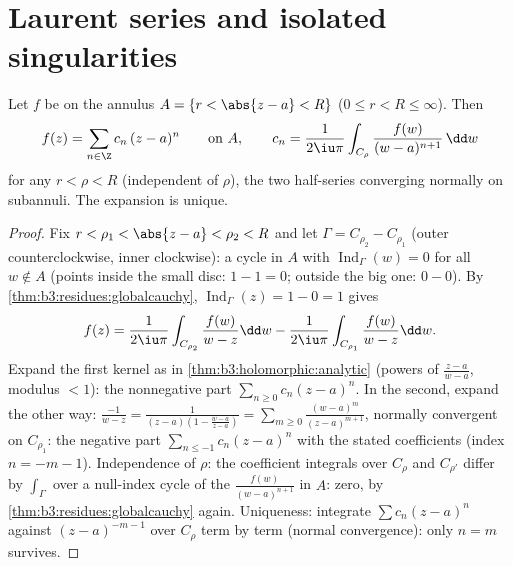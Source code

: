 \section{Laurent series and isolated singularities}

\begin{theorem}\label{thm:b3:residues:laurent}
Let $f$ be  on the annulus $A = \{r < \abs{z - a} <
R\}$ ($0 \leq r < R \leq \infty$). Then
\[
f(z) = \sum_{n\in\Z}c_n\,(z - a)^n
\qquad\text{on } A,
\qquad
c_n = \frac1{2\iu\pi}\int_{C_\rho}\frac{f(w)}{(w -
a)^{n+1}}\,\dd w
\]
for any $r < \rho < R$ (independent of $\rho$), the two
half-series converging normally on  subannuli. The
expansion is unique.
\end{theorem}

\begin{proof}
Fix $r < \rho_1 < \abs{z - a} < \rho_2 < R$ and let $\Gamma =
C_{\rho_2} - C_{\rho_1}$ (outer counterclockwise, inner
clockwise): a cycle in $A$ with
$\operatorname{Ind}_\Gamma(w) = 0$ for all $w \notin A$
(points inside the small disc: $1 - 1 = 0$; outside the big
one: $0 - 0$). By \cref{thm:b3:residues:globalcauchy},
$\operatorname{Ind}_\Gamma(z) = 1 - 0 = 1$ gives
\[
f(z) = \frac1{2\iu\pi}\int_{C_{\rho_2}}\frac{f(w)}{w - z}\dd
w - \frac1{2\iu\pi}\int_{C_{\rho_1}}\frac{f(w)}{w - z}\dd w .
\]
Expand the first kernel as in
\cref{thm:b3:holomorphic:analytic} (powers of $\frac{z -
a}{w - a}$, modulus $< 1$): the nonnegative part
$\sum_{n\geq0}c_n(z-a)^n$. In the second, expand the other
way: $\frac{-1}{w - z} = \frac1{(z-a)(1 - \frac{w - a}{z -
a})} = \sum_{m\geq0}\frac{(w-a)^m}{(z - a)^{m+1}}$, normally
convergent on $C_{\rho_1}$: the negative part
$\sum_{n\leq-1}c_n(z-a)^n$ with the stated coefficients (index
$n = -m-1$). Independence of $\rho$: the coefficient integrals
over $C_{\rho}$ and $C_{\rho'}$ differ by
$\int_\Gamma$ over a null-index cycle of the 
$\frac{f(w)}{(w-a)^{n+1}}$ in $A$: zero, by
\cref{thm:b3:residues:globalcauchy} again. Uniqueness:
integrate $\sum c_n(z-a)^n$ against $(z - a)^{-m-1}$ over
$C_\rho$ term by term (normal convergence): only $n = m$
survives.
\end{proof}

